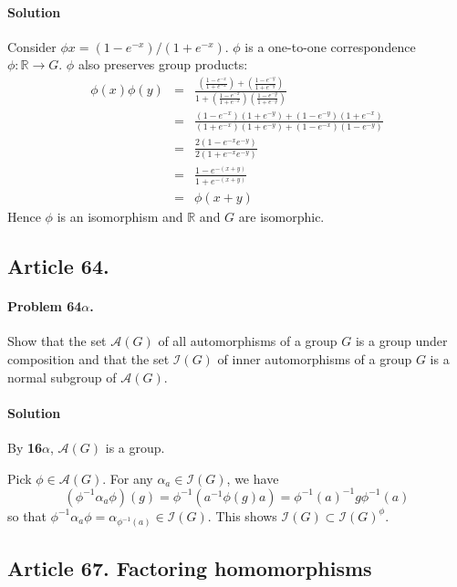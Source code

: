 \paragraph*{Solution}
Consider $\phi x = (1-e^{-x}) / (1 + e^{-x})$. $\phi$ is a one-to-one correspondence
$\phi : \mathbb{R} \rightarrow G$. $\phi$ also preserves group products:
\begin{eqnarray*}
\phi(x)\phi(y) & = & \frac{(\frac{1-e^{-x}}{1+e^{-x}}) + (\frac{1-e^{-y}}{1+e^{-y}})}
{1 + (\frac{1-e^{-x}}{1+e^{-x}})(\frac{1-e^{-y}}{1+e^{-y}})} \\
& = & \frac{(1-e^{-x})(1+e^{-y}) + (1-e^{-y})(1+e^{-x})}
{(1+e^{-x})(1+e^{-y})+(1-e^{-x})(1-e^{-y})} \\
& = & \frac{2(1-e^{-x}e^{-y})}{2(1 + e^{-x}e^{-y})} \\
& = & \frac{1 - e^{-(x+y)}}{1+e^{-(x+y)}} \\
& = & \phi (x+y)
\end{eqnarray*}
Hence $\phi$ is an isomorphism and $\mathbb{R}$ and $G$ are isomorphic.

\subsection{Article 64.}

\paragraph{Problem 64$\alpha$.}
Show that the set $\mathcal{A}(G)$ of all automorphisms of a group $G$
is a group under composition and that the set $\mathcal{I}(G)$ of inner
automorphisms of a group $G$ is a normal subgroup of $\mathcal{A}(G)$.

\paragraph*{Solution}
By \textbf{16$\alpha$}, $\mathcal{A}(G)$ is a group.

Pick $\phi \in \mathcal{A}(G)$. For any $\alpha_a \in \mathcal{I}(G)$,
we have
$$ (\phi^{-1} \alpha_a \phi)(g) = \phi^{-1}(a^{-1}\phi(g)a)
= \phi^{-1}(a)^{-1} g \phi^{-1}(a) $$
so that $\phi^{-1} \alpha_a \phi = \alpha_{\phi^{-1}(a)} \in \mathcal{I}(G)$.
This shows $\mathcal{I}(G) \subset \mathcal{I}(G)^\phi$.

\subsection{Article 67. Factoring homomorphisms}

